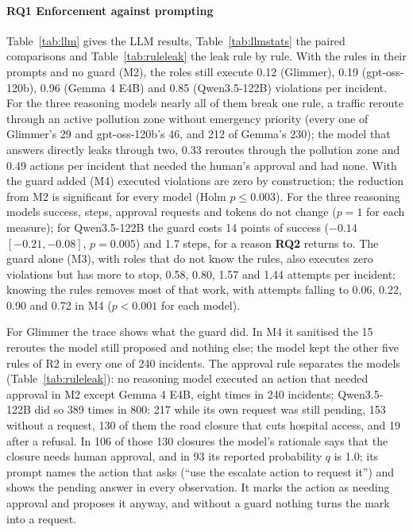 \documentclass[10pt,conference]{IEEEtran}
\newcommand{\RQ}[1]{\textbf{RQ#1}}
\begin{document}
\paragraph{\RQ{1} Enforcement against prompting}
Table~\ref{tab:llm} gives the LLM results, Table~\ref{tab:llmstats} the paired comparisons and Table~\ref{tab:ruleleak} the leak rule by rule. With the rules in their prompts and no guard (M2), the roles still execute 0.12 (Glimmer), 0.19 (gpt-oss-120b), 0.96 (Gemma 4 E4B) and 0.85 (Qwen3.5-122B) violations per incident. For the three reasoning models nearly all of them break one rule, a traffic reroute through an active pollution zone without emergency priority (every one of Glimmer's 29 and gpt-oss-120b's 46, and 212 of Gemma's 230); the model that answers directly leaks through two, 0.33 reroutes through the pollution zone and 0.49 actions per incident that needed the human's approval and had none. With the guard added (M4) executed violations are zero by construction; the reduction from M2 is significant for every model (Holm $p \leq 0.003$). For the three reasoning models success, steps, approval requests and tokens do not change ($p = 1$ for each measure); for Qwen3.5-122B the guard costs 14 points of success ($-0.14$ $[-0.21, -0.08]$, $p = 0.005$) and 1.7 steps, for a reason \RQ{2} returns to. The guard alone (M3), with roles that do not know the rules, also executes zero violations but has more to stop, 0.58, 0.80, 1.57 and 1.44 attempts per incident; knowing the rules removes most of that work, with attempts falling to 0.06, 0.22, 0.90 and 0.72 in M4 ($p < 0.001$ for each model).

For Glimmer the trace shows what the guard did. In M4 it sanitised the 15 reroutes the model still proposed and nothing else; the model kept the other five rules of R2 in every one of 240 incidents. The approval rule separates the models (Table~\ref{tab:ruleleak}): no reasoning model executed an action that needed approval in M2 except Gemma 4 E4B, eight times in 240 incidents; Qwen3.5-122B did so 389 times in 800: 217 while its own request was still pending, 153 without a request, 130 of them the road closure that cuts hospital access, and 19 after a refusal. In 106 of those 130 closures the model's rationale says that the closure needs human approval, and in 93 its reported probability $q$ is 1.0; its prompt names the action that asks (``use the escalate action to request it'') and shows the pending answer in every observation. It marks the action as needing approval and proposes it anyway, and without a guard nothing turns the mark into a request.
\end{document}
